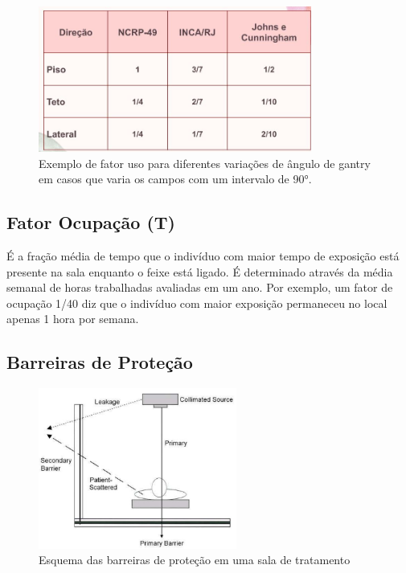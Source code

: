 \documentclass[11pt,a4paper]{article}
\newcounter{exemplo}
\begin{document}
            \begin{figure}[h]
                \centering
                \includegraphics[width=0.8\textwidth]{Imagens/fatorUso2.JPG}
                \caption{Exemplo de fator uso para diferentes variações de ângulo de gantry em casos que varia os campos com um intervalo de \ang{90}.}
                \label{fig:fatorUso2}
            \end{figure}


        \subsection*{\textcolor{CarnationPink}{Fator Ocupação (T)}}

            É a fração média de tempo que o indivíduo com maior tempo de exposição está presente na sala enquanto o feixe está ligado. É determinado através da média semanal de horas trabalhadas avaliadas em um ano. Por exemplo, um fator de ocupação 1/40 diz que o indivíduo com maior exposição permaneceu no local apenas 1 hora por semana.
        
        \subsection{Barreiras de Proteção}

            \begin{figure}
                \centering
                \includegraphics[width=0.58\textwidth]{Imagens/esquemaBarreirasDeProtecao.JPG}
                \caption{Esquema das barreiras de proteção em uma sala de tratamento}
                \label{fig:esquemaBarreirasDeProtecao}
            \end{figure}
\end{document}
